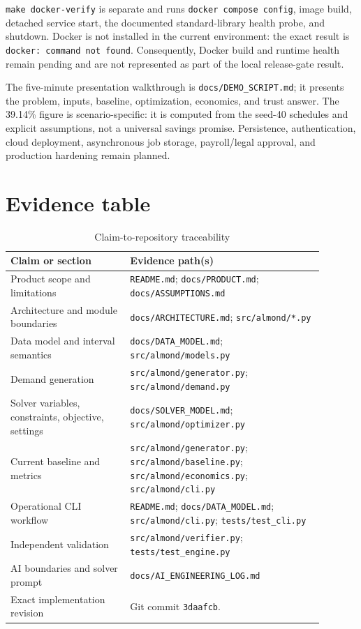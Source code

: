 \documentclass[11pt,a4paper]{article}
\begin{document}
\texttt{make docker-verify} is separate and runs \texttt{docker compose config}, image build, detached service start, the documented standard-library health probe, and shutdown. Docker is not installed in the current environment: the exact result is \texttt{docker: command not found}. Consequently, Docker build and runtime health remain pending and are not represented as part of the local release-gate result.

The five-minute presentation walkthrough is \texttt{docs/DEMO\_SCRIPT.md}; it presents the problem, inputs, baseline, optimization, economics, and trust answer. The 39.14\% figure is scenario-specific: it is computed from the seed-40 schedules and explicit assumptions, not a universal savings promise. Persistence, authentication, cloud deployment, asynchronous job storage, payroll/legal approval, and production hardening remain planned.

\section{Evidence table}
\begin{longtable}{p{0.34\linewidth}p{0.55\linewidth}}
\caption{Claim-to-repository traceability}\label{tab:evidence}\\
\toprule
Claim or section & Evidence path(s)\\
\midrule
Product scope and limitations & \texttt{README.md}; \texttt{docs/PRODUCT.md}; \texttt{docs/ASSUMPTIONS.md}\\
Architecture and module boundaries & \texttt{docs/ARCHITECTURE.md}; \texttt{src/almond/*.py}\\
Data model and interval semantics & \texttt{docs/DATA\_MODEL.md}; \texttt{src/almond/models.py}\\
Demand generation & \texttt{src/almond/generator.py}; \texttt{src/almond/demand.py}\\
Solver variables, constraints, objective, settings & \texttt{docs/SOLVER\_MODEL.md}; \texttt{src/almond/optimizer.py}\\
Current baseline and metrics & \texttt{src/almond/generator.py}; \texttt{src/almond/baseline.py}; \texttt{src/almond/economics.py}; \texttt{src/almond/cli.py}\\
Operational CLI workflow & \texttt{README.md}; \texttt{docs/DATA\_MODEL.md}; \texttt{src/almond/cli.py}; \texttt{tests/test\_cli.py}\\
Independent validation & \texttt{src/almond/verifier.py}; \texttt{tests/test\_engine.py}\\
AI boundaries and solver prompt & \texttt{docs/AI\_ENGINEERING\_LOG.md}\\
Exact implementation revision & Git commit \texttt{3daafcb}.\\
\bottomrule
\end{longtable}
\end{document}
